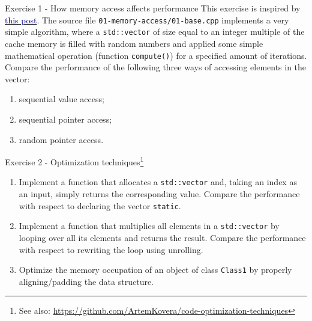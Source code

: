 \documentclass[10pt]{beamer}
\begin{document}
\begin{frame}{Exercise 1 - How memory access affects performance}
    This exercise is inspired by \href{https://bitbashing.io/memory-performance.html}{\textcolor{DarkBlue}{this post}}.
    \vfill
    The source file \texttt{01-memory-access/01-base.cpp} implements a very simple algorithm, where a \texttt{std::vector} of size equal to an integer multiple of the cache memory is filled with random numbers and applied some simple mathematical operation (function \texttt{compute()}) for a specified amount of iterations.
    \vfill
    Compare the performance of the following three ways of accessing elements in the vector:
    \begin{enumerate}
        \item sequential value access;
        \item sequential pointer access;
        \item random pointer access.
    \end{enumerate}
\end{frame}

\begin{frame}{Exercise 2 - Optimization techniques\footnote{See also: \url{https://github.com/ArtemKovera/code-optimization-techniques}}}
    \begin{enumerate}
        \item Implement a function that allocates a \texttt{std::vector} and, taking an index as an input, simply returns the corresponding value. Compare the performance with respect to declaring the vector \texttt{static}.
        \item Implement a function that multiplies all elements in a \texttt{std::vector} by looping over all its elements and returns the result. Compare the performance with respect to rewriting the loop using unrolling.
        \item Optimize the memory occupation of an object of class \texttt{Class1} by properly aligning/padding the data structure.
    \end{enumerate}
\end{frame}
\end{document}
